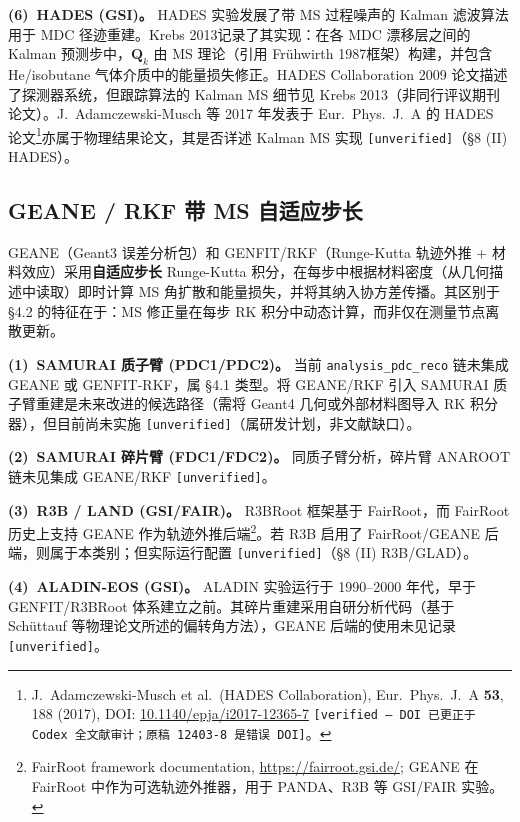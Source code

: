 \documentclass[a4paper, 11pt]{article}
\begin{document}
\textbf{(6)~HADES (GSI)。}
HADES 实验发展了带 MS 过程噪声的 Kalman 滤波算法用于 MDC 径迹重建。Krebs 2013记录了其实现：在各 MDC 漂移层之间的 Kalman 预测步中，$\mathbf{Q}_k$ 由 MS 理论（引用 Frühwirth 1987框架）构建，并包含 He/isobutane 气体介质中的能量损失修正。HADES Collaboration 2009 论文描述了探测器系统，但跟踪算法的 Kalman MS 细节见 Krebs 2013（非同行评议期刊论文）。J.~Adamczewski-Musch 等 2017 年发表于 Eur.~Phys.~J.~A 的 HADES 论文\footnote{\label{fn:hades2017}J.~Adamczewski-Musch et al.\ (HADES Collaboration), Eur.\ Phys.\ J.\ A \textbf{53}, 188 (2017), DOI: \href{https://doi.org/10.1140/epja/i2017-12365-7}{10.1140/epja/i2017-12365-7} \texttt{[verified --- DOI 已更正于 Codex 全文献审计；原稿 12403-8 是错误 DOI]}。}亦属于物理结果论文，其是否详述 Kalman MS 实现 \texttt{[unverified]}（§8 (II) HADES）。

\subsection{GEANE / RKF 带 MS 自适应步长}
\label{sec:algo_geane}

GEANE（Geant3 误差分析包）和 GENFIT/RKF（Runge-Kutta 轨迹外推 + 材料效应）采用\textbf{自适应步长} Runge-Kutta 积分，在每步中根据材料密度（从几何描述中读取）即时计算 MS 角扩散和能量损失，并将其纳入协方差传播。其区别于 §4.2 的特征在于：MS 修正量在每步 RK 积分中动态计算，而非仅在测量节点离散更新。

\textbf{(1)~SAMURAI 质子臂 (PDC1/PDC2)。}
当前 \texttt{analysis\_pdc\_reco} 链未集成 GEANE 或 GENFIT-RKF，属 §4.1 类型。将 GEANE/RKF 引入 SAMURAI 质子臂重建是未来改进的候选路径（需将 Geant4 几何或外部材料图导入 RK 积分器），但目前尚未实施 \texttt{[unverified]}（属研发计划，非文献缺口）。

\textbf{(2)~SAMURAI 碎片臂 (FDC1/FDC2)。}
同质子臂分析，碎片臂 ANAROOT 链未见集成 GEANE/RKF \texttt{[unverified]}。

\textbf{(3)~R3B / LAND (GSI/FAIR)。}
R3BRoot 框架基于 FairRoot，而 FairRoot 历史上支持 GEANE 作为轨迹外推后端\footnote{\label{fn:fairroot_geane}FairRoot framework documentation, \url{https://fairroot.gsi.de/}; GEANE 在 FairRoot 中作为可选轨迹外推器，用于 PANDA、R3B 等 GSI/FAIR 实验。}。若 R3B 启用了 FairRoot/GEANE 后端，则属于本类别；但实际运行配置 \texttt{[unverified]}（§8 (II) R3B/GLAD）。

\textbf{(4)~ALADIN-EOS (GSI)。}
ALADIN 实验运行于 1990--2000 年代，早于 GENFIT/R3BRoot 体系建立之前。其碎片重建采用自研分析代码（基于 Schüttauf 等物理论文所述的偏转角方法），GEANE 后端的使用未见记录 \texttt{[unverified]}。
\end{document}
